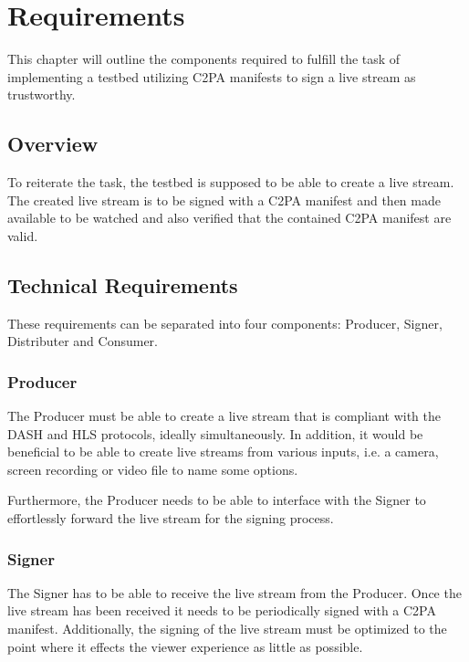 \chapter{Requirements\label{cha:chapter3}}

This chapter will outline the components required to fulfill the task of implementing a testbed utilizing C2PA manifests to sign a live stream as trustworthy.

\section{Overview\label{sec:reqoverview}}

To reiterate the task, the testbed is supposed to be able to create a live stream. The created live stream is to be signed with a C2PA manifest and then made available to be watched and also verified that the contained C2PA manifest are valid. 

\section{Technical Requirements\label{sec:techreq}}

These requirements can be separated into four components: Producer, Signer, Distributer and Consumer. 

\subsection{Producer}

The Producer must be able to create a live stream that is compliant with the DASH and HLS protocols, ideally simultaneously. In addition, it would be beneficial to be able to create live streams from various inputs, i.e. a camera, screen recording or video file to name some options.

Furthermore, the Producer needs to be able to interface with the Signer to effortlessly forward the live stream for the signing process.

\subsection{Signer}

The Signer has to be able to receive the live stream from the Producer. Once the live stream has been received it needs to be periodically signed with a C2PA manifest. Additionally, the signing of the live stream must be optimized to the point where it effects the viewer experience as little as possible.

